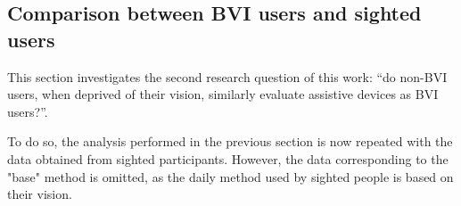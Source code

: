 %

\subsection{Comparison between BVI users and sighted users}
\label{sec:results_obj_2}

This section investigates the second research question of this work: “do non-BVI users, when deprived of their vision, similarly evaluate assistive devices as BVI users?”. 

To do so, the analysis performed in the previous section is now repeated with the data obtained from sighted participants. However, the data corresponding to the "base" method is omitted, as the daily method used by sighted people is based on their vision.

%








